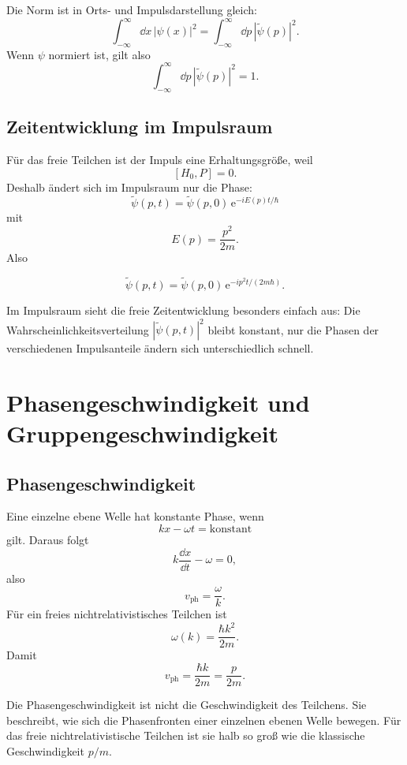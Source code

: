 \begin{formulabox}
Die Norm ist in Orts- und Impulsdarstellung gleich:
\[
    \int_{-\infty}^{\infty}\dd x\,|\psi(x)|^2
    =\int_{-\infty}^{\infty}\dd p\,|\widetilde{\psi}(p)|^2.
\]
Wenn $\psi$ normiert ist, gilt also
\[
    \int_{-\infty}^{\infty}\dd p\,|\widetilde{\psi}(p)|^2=1.
\]
\end{formulabox}

\subsection{Zeitentwicklung im Impulsraum}

Für das freie Teilchen ist der Impuls eine Erhaltungsgröße, weil
\[
    [H_0,P]=0.
\]
Deshalb ändert sich im Impulsraum nur die Phase:
\[
    \widetilde{\psi}(p,t)
    =\widetilde{\psi}(p,0)\,
    \mathrm{e}^{-iE(p)t/\hbar}
\]
mit
\[
    E(p)=\frac{p^2}{2m}.
\]
Also
\begin{formulabox}
\[
    \widetilde{\psi}(p,t)
    =\widetilde{\psi}(p,0)\,
    \mathrm{e}^{-ip^2t/(2m\hbar)}.
\]
\end{formulabox}

\begin{notebox}
Im Impulsraum sieht die freie Zeitentwicklung besonders einfach aus: Die Wahrscheinlichkeitsverteilung $|\widetilde{\psi}(p,t)|^2$ bleibt konstant, nur die Phasen der verschiedenen Impulsanteile ändern sich unterschiedlich schnell.
\end{notebox}

\section{Phasengeschwindigkeit und Gruppengeschwindigkeit}

\subsection{Phasengeschwindigkeit}

Eine einzelne ebene Welle hat konstante Phase, wenn
\[
    kx-\omega t=\text{konstant}
\]
gilt. Daraus folgt
\[
    k\frac{\dd x}{\dd t}-\omega=0,
\]
also
\[
    v_\text{ph}=\frac{\omega}{k}.
\]
Für ein freies nichtrelativistisches Teilchen ist
\[
    \omega(k)=\frac{\hbar k^2}{2m}.
\]
Damit
\[
    v_\text{ph}=\frac{\hbar k}{2m}=\frac{p}{2m}.
\]

\begin{notebox}
Die Phasengeschwindigkeit ist nicht die Geschwindigkeit des Teilchens. Sie beschreibt, wie sich die Phasenfronten einer einzelnen ebenen Welle bewegen. Für das freie nichtrelativistische Teilchen ist sie halb so groß wie die klassische Geschwindigkeit $p/m$.
\end{notebox}

